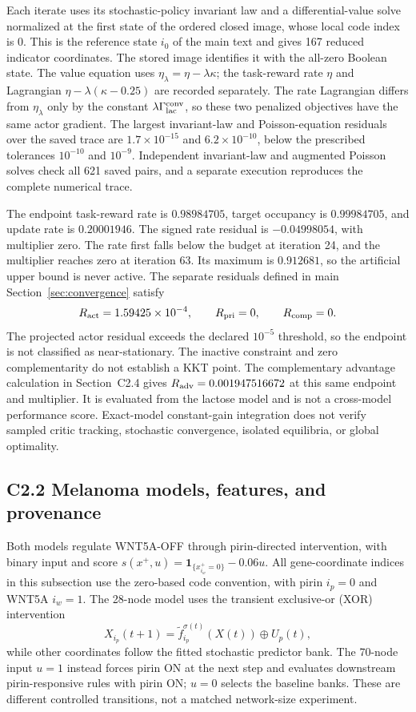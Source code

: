\documentclass[11pt]{article}
\newcommand{\1}{\mathbf{1}}
\begin{document}
Each iterate uses its stochastic-policy invariant law and a differential-value solve normalized at the first state of the ordered closed image, whose local code index is 0. This is the reference state $i_0$ of the main text and gives 167 reduced indicator coordinates. The stored image identifies it with the all-zero Boolean state. The value equation uses $\eta_\lambda=\eta-\lambda\kappa$; the task-reward rate $\eta$ and Lagrangian $\eta-\lambda(\kappa-0.25)$ are recorded separately. The rate Lagrangian differs from $\eta_\lambda$ only by the constant $\lambda\Gamma_{\rm lac}^{\rm conv}$, so these two penalized objectives have the same actor gradient. The largest invariant-law and Poisson-equation residuals over the saved trace are $1.7\times10^{-15}$ and $6.2\times10^{-10}$, below the prescribed tolerances $10^{-10}$ and $10^{-9}$. Independent invariant-law and augmented Poisson solves check all 621 saved pairs, and a separate execution reproduces the complete numerical trace.

The endpoint task-reward rate is $0.98984705$, target occupancy is $0.99984705$, and update rate is $0.20001946$. The signed rate residual is $-0.04998054$, with multiplier zero. The rate first falls below the budget at iteration 24, and the multiplier reaches zero at iteration 63. Its maximum is $0.912681$, so the artificial upper bound is never active. The separate residuals defined in main Section~\ref*{sec:convergence} satisfy
\[
 R_{\rm act}=1.59425\times10^{-4},\qquad
 R_{\rm pri}=0,\qquad R_{\rm comp}=0.
\]
The projected actor residual exceeds the declared $10^{-5}$ threshold, so the endpoint is not classified as near-stationary. The inactive constraint and zero complementarity do not establish a KKT point. The complementary advantage calculation in Section~C2.4 gives $R_{\rm adv}=0.001947516672$ at this same endpoint and multiplier. It is evaluated from the lactose model and is not a cross-model performance score. Exact-model constant-gain integration does not verify sampled critic tracking, stochastic convergence, isolated equilibria, or global optimality.

\subsection*{C2.2 Melanoma models, features, and provenance}
\label{comp:sec:melanoma}
Both models regulate WNT5A-OFF through pirin-directed intervention, with binary input and score $s(x^+,u)=\1_{\{x^+_{i_w}=0\}}-0.06u$. All gene-coordinate indices in this subsection use the zero-based code convention, with pirin $i_p=0$ and WNT5A $i_w=1$. The 28-node model uses the transient exclusive-or (XOR) intervention
\[
 X_{i_p}(t+1)=\tilde f_{i_p}^{\sigma(t)}(X(t))\oplus U_p(t),
\]
while other coordinates follow the fitted stochastic predictor bank. The 70-node input $u=1$ instead forces pirin ON at the next step and evaluates downstream pirin-responsive rules with pirin ON; $u=0$ selects the baseline banks. These are different controlled transitions, not a matched network-size experiment.
\end{document}
